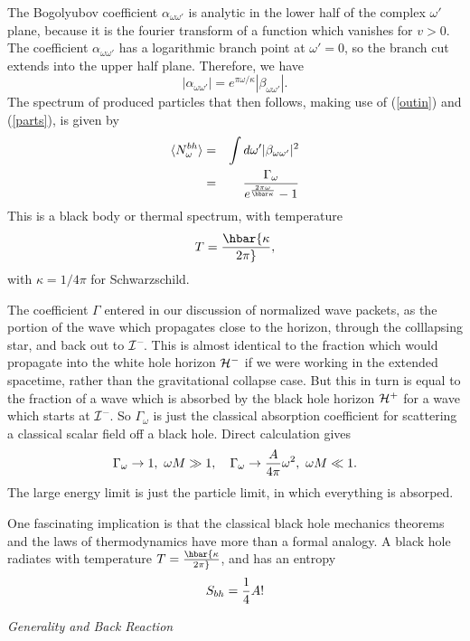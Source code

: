 \documentclass[12pt]{article}
\newcommand{\be}{\begin{equation}}
\newcommand{\ee}{\end{equation}}
\def\bena{\begin{eqnarray}}
\def\eena{\end{eqnarray}}
\def\fh{{\cal H}^+}
\def\ph{{\cal H}^-}
\def\pinf{{\cal I}^-}
\def\alp{\alpha _{\omega \omega '}}
\def\bet{\beta_{\omega\omega '}}
\begin{document}
The Bogolyubov coefficient
$\alp$ is analytic in the lower half of the complex $\omega '$ plane, because
it is the fourier transform of a function which vanishes for $v>0$.  The
coefficient
$\alp$ has a logarithmic branch point at $\omega '= 0$, so the branch cut
extends into the upper half plane. Therefore, we have
%
\be\label{abratio}|\alp |=e^{\pi\omega /\kappa} |\bet |.\ee
%
The spectrum of produced particles that then follows, making use of
(\ref{outin}) and
(\ref{parts}),
is given by
%
\bena\label{bhspec} \langle N_{\omega }^{bh} \rangle & =&\int d\omega ' |\bet |^2 \\
 &=&{\Gamma_{\omega} \over e^{ {2\pi \omega \over
\hbar \kappa} } -1 }\eena
%
This is a black body or thermal spectrum, with temperature
%
\be\label{bhtemp}T=\hbar {\kappa\over 2\pi},\ee
%
with $\kappa =1/ 4\pi$  for Schwarzschild.

The coefficient $\Gamma$ entered in our discussion of normalized wave packets,
as the portion of the wave which propagates close to the horizon, through
the colllapsing star, and back out to $\pinf\!$. This is almost identical
to the fraction which would propagate into the white hole horizon $\ph$
if we were working in the extended spacetime, rather than the gravitational
collapse case. But this in turn is equal to the fraction of a wave
which is absorbed by the black hole horizon $\fh$ for a wave which starts
at $\pinf\!$. So $\Gamma _{\omega}$ is just the classical absorption coefficient
for scattering a classical scalar field off a black hole.  Direct
calculation gives
%
\be\label{absorption}\Gamma _{\omega}\rightarrow 1 ,\  \omega M\gg 1, \quad
\Gamma _{\omega}\rightarrow {A\over 4\pi} \omega ^2 ,\  \omega M\ll 1 .\ee
%
The large energy limit is just the particle
limit, in which everything is absorped.

One fascinating implication is that the classical black hole mechanics theorems
and the laws of thermodynamics have more than a formal analogy. A black hole
radiates with  temperature $T=\hbar {\kappa\over 2\pi}$, and has an entropy
%
\be\label{bhentropy} S_{bh}= {1\over 4} A!\ee
%

\vskip 0.1in\noindent\goodbreak
{\it Generality and Back Reaction }
\vskip 0.05in
\end{document}
